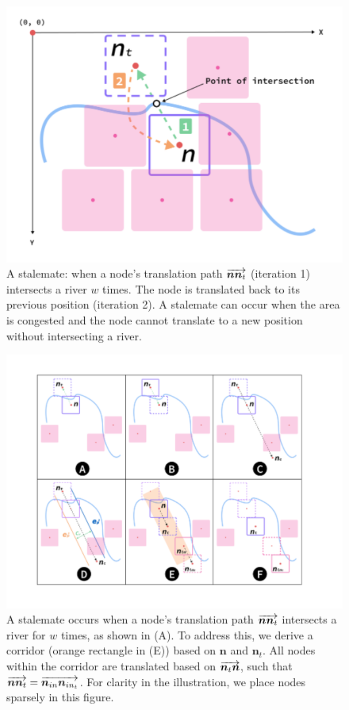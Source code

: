 \documentclass[Afour,sagev,times]{sagej}
\newcommand{\Vector}[1]{\protect\overrightarrow{#1}}
\newcommand{\stalemateMax}{w}
\newcommand{\node}{\bm{n}}
\newcommand{\nodeFNOR}{\node_t}
\newcommand{\nodeVectorTC}{\Vector{\nodeFNOR\node}}
\newcommand{\nodeVectorCT}{\Vector{\node\nodeFNOR}}
\newcommand{\nodeInCorridor}{\node_{in}}
\newcommand{\nodeInCorridorT}{\node_{in_t}}
\newcommand{\nodeVectorNNn}{\Vector{\node\node_{t}}}
\newcommand{\nodeVectorNinNinn}{\Vector{\nodeInCorridor\nodeInCorridorT}}
\begin{document}
{
\begin{figure}[tb!]
    \centering
    \includegraphics[width=\columnwidth,keepaspectratio]{stalemate.png}
    \caption{A stalemate: when a node's translation path $ \nodeVectorCT $ (iteration 1) intersects a river $ \stalemateMax $ times.
        The node is translated back to its previous position (iteration 2).
        A stalemate can occur when the area is congested and the node cannot translate to a new position without intersecting a river.}
    \label{fig:stalemate}
\end{figure}
}

{
\begin{figure}[tb!]
    \centering
    \includegraphics[width=\columnwidth,keepaspectratio]{corridor.png}
    \caption{A stalemate occurs when a node's translation path $ \nodeVectorCT $ intersects a river for $ \stalemateMax $ times, as shown in (A).
        To address this, we derive a corridor (orange rectangle in (E)) based on $ \node $ and $ \nodeFNOR $.
        All nodes within the corridor are translated based on $ \nodeVectorTC $, such that $ \nodeVectorNNn = \nodeVectorNinNinn $.
        For clarity in the illustration, we place nodes sparsely in this figure.}
    \label{fig:corridor}
\end{figure}
}
\end{document}
